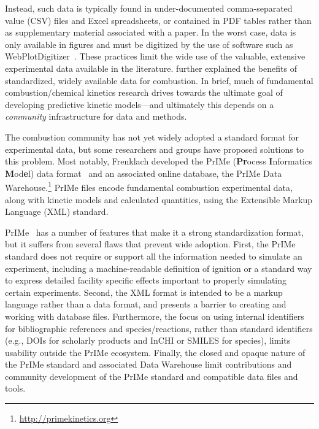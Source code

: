 \documentclass[12pt]{ijck}
\begin{document}
Instead, such data is typically found in under-documented comma-separated value
(CSV) files and Excel spreadsheets, or contained in PDF tables rather than as
supplementary material associated with a paper. In the worst case, data is only
available in figures and must be digitized by the use of software such as
WebPlotDigitizer~\autocite{WebPlotDigitizer}. These practices limit the wide use
of the valuable, extensive experimental data available in the literature.
\textcite{Frenklach:2007bm} further explained the benefits of standardized,
widely available data for combustion. In brief, much of fundamental
combustion\slash chemical kinetics research drives towards the ultimate goal of
developing predictive kinetic models---and ultimately this depends on a
\emph{community} infrastructure for data and methods.

The combustion community has not yet widely adopted a standard format for
experimental data, but some researchers and groups have proposed solutions to
this problem. Most notably, Frenklach developed the PrIMe (\textbf{Pr}ocess
\textbf{I}nformatics \textbf{M}od\textbf{e}l) data
format~\autocite{Frenklach:2007bm,You:2011hy} and an associated online database,
the PrIMe Data Warehouse.\footnote{\url{http://primekinetics.org}}
PrIMe files encode fundamental
combustion experimental data, along with kinetic models and calculated
quantities, using the Extensible Markup Language (XML) standard.

PrIMe~\autocite{Frenklach:2007bm,You:2011hy} has a number of features that make
it a strong standardization format, but it suffers from several flaws that
prevent wide adoption. First, the PrIMe standard does not require or support all
the information needed to simulate an experiment, including a machine-readable
definition of ignition or a standard way to express detailed facility specific
effects important to properly simulating certain experiments. Second, the XML
format is intended to be a markup language rather than a data format, and
presents a barrier to creating and working with database files. Furthermore, the
focus on using internal identifiers for bibliographic references and
species\slash reactions, rather than standard identifiers (e.g., DOIs for
scholarly products and InCHI or SMILES for species), limits usability outside
the PrIMe ecosystem. Finally, the closed and opaque nature of the PrIMe standard
and associated Data Warehouse limit contributions and community development of
the PrIMe standard and compatible data files and tools.
\end{document}
